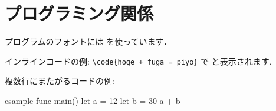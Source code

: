%
%

\section{プログラミング関係}

\par プログラムのフォントには  を使っています．
\par インラインコードの例:  \verb|\code{hoge + fuga = piyo}| で  と表示されます.
\par 複数行にまたがるコードの例:

\begin{program}[linenos]{c}{sample}
  func main() {
      let a = 12
      let b = 30
      a + b
    }
\end{program}

